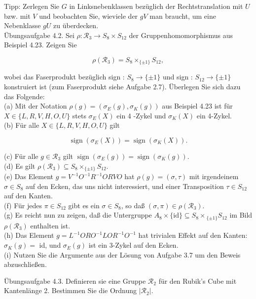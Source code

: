 \documentclass[10pt, letterpaper]{article}
\begin{document}
Tipp: Zerlegen Sie $G$ in Linksnebenklassen bezüglich der Rechtstranslation mit $U$ bzw. mit $V$ und beobachten Sie, wieviele der $g V$ man braucht, um eine Nebenklasse $g U$ zu überdecken.\\
Übungsaufgabe 4.2. Sei $\rho: \mathscr{R}_{3} \rightarrow S_{8} \times S_{12}$ der Gruppenhomomorphismus aus Beispiel 4.23. Zeigen Sie

$$
\rho\left(\mathscr{R}_{3}\right)=S_{8} \times_{\{ \pm 1\}} S_{12},
$$

wobei das Faserprodukt bezüglich sign : $S_{8} \rightarrow\{ \pm 1\}$ und sign : $S_{12} \rightarrow\{ \pm 1\}$ konstruiert ist (zum Faserprodukt siehe Aufgabe 2.7). Überlegen Sie sich dazu das Folgende:\\
(a) Mit der Notation $\rho(g)=\left(\sigma_{E}(g), \sigma_{K}(g)\right)$ aus Beispiel 4.23 ist für $X \in\{L, R, V, H, O, U\}$ stets $\sigma_{E}(X)$ ein 4 -Zykel und $\sigma_{K}(X)$ ein 4-Zykel.\\
(b) Für alle $X \in\{L, R, V, H, O, U\}$ gilt

$$
\operatorname{sign}\left(\sigma_{E}(X)\right)=\operatorname{sign}\left(\sigma_{K}(X)\right) .
$$

(c) Für alle $g \in \mathscr{R}_{3}$ gilt $\operatorname{sign}\left(\sigma_{E}(g)\right)=\operatorname{sign}\left(\sigma_{K}(g)\right)$.\\
(d) Es gilt $\rho\left(\mathscr{R}_{3}\right) \subseteq S_{8} \times_{\{ \pm 1\}} S_{12}$.\\
(e) Das Element $g=V^{-1} O^{-1} R^{-1} O R V O$ hat $\rho(g)=(\sigma, \tau)$ mit irgendeinem $\sigma \in S_{8}$ auf den Ecken, das uns nicht interessiert, und einer Transposition $\tau \in S_{12}$ auf den Kanten.\\
(f) Für jedes $\pi \in S_{12}$ gibt es ein $\sigma \in S_{8}$, so daß $(\sigma, \pi) \in \rho\left(\mathscr{R}_{3}\right)$.\\
(g) Es reicht nun zu zeigen, daß die Untergruppe $A_{8} \times\{\mathrm{id}\} \subseteq S_{8} \times{ }_{\{ \pm 1\}} S_{12}$ im Bild $\rho\left(\mathscr{R}_{3}\right)$ enthalten ist.\\
(h) Das Element $g=L^{-1} O R O^{-1} L O R^{-1} O^{-1}$ hat trivialen Effekt auf den Kanten: $\sigma_{K}(g)=$ id, und $\sigma_{E}(g)$ ist ein 3-Zykel auf den Ecken.\\
(i) Nutzen Sie die Argumente aus der Lösung von Aufgabe 3.7 um den Beweis abzuschließen.

Übungsaufgabe 4.3. Definieren sie eine Gruppe $\mathscr{R}_{2}$ für den Rubik's Cube mit Kantenlänge 2. Bestimmen Sie die Ordnung $\left|\mathscr{R}_{2}\right|$.
\end{document}

